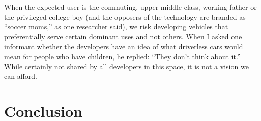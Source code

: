 
When the
expected user is the commuting, upper-middle-class, working father or
the privileged college boy (and the opposers of the technology are
branded as ``soccer moms,'' as one researcher said), we risk developing
vehicles that preferentially serve certain dominant uses and not
others. When I asked one informant whether the developers have an idea
of what driverless cars would mean for people who have children, he
replied:  ``They don't think about it.'' While certainly not shared by
all developers in this space, it is not a vision we can afford.

\section{Conclusion}



